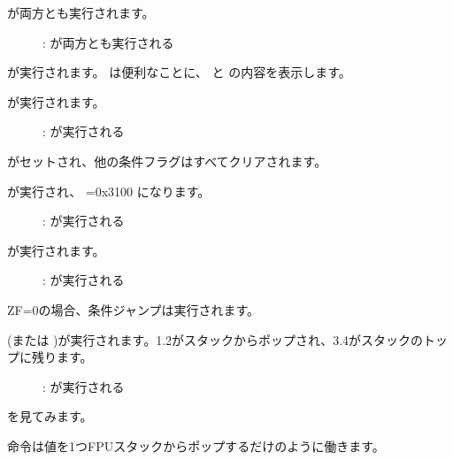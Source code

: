 ﻿\clearpage
{}
\myindex{\olly}

\FLD が両方とも実行されます。

\begin{figure}[H]
\centering
{}
\caption{\olly: \FLD が両方とも実行される}
\label{fig:FPU_comparison_Ox_case1_olly1}
\end{figure}

\FCOM が実行されます。
\olly は便利なことに、 と の内容を表示します。

\clearpage
\FCOM が実行されます。

\begin{figure}[H]
\centering
{}
\caption{\olly: \FCOM が実行される}
\label{fig:FPU_comparison_Ox_case1_olly2}
\end{figure}

\Czero がセットされ、他の条件フラグはすべてクリアされます。

\clearpage
\FNSTSW が実行され、 =0x3100 になります。

\begin{figure}[H]
\centering
{}
\caption{\olly: \FNSTSW が実行される}
\label{fig:FPU_comparison_Ox_case1_olly3}
\end{figure}

\clearpage
\TEST が実行されます。

\begin{figure}[H]
\centering
{}
\caption{\olly: \TEST が実行される}
\label{fig:FPU_comparison_Ox_case1_olly4}
\end{figure}

ZF=0の場合、条件ジャンプは実行されます。

\clearpage
{} (または \FSTP {})が実行されます。1.2がスタックからポップされ、3.4がスタックのトップに残ります。

\begin{figure}[H]
\centering
{}
\caption{\olly: \FSTP が実行される}
\label{fig:FPU_comparison_Ox_case1_olly5}
\end{figure}

 を見てみます。

命令は値を1つFPUスタックからポップするだけのように働きます。

